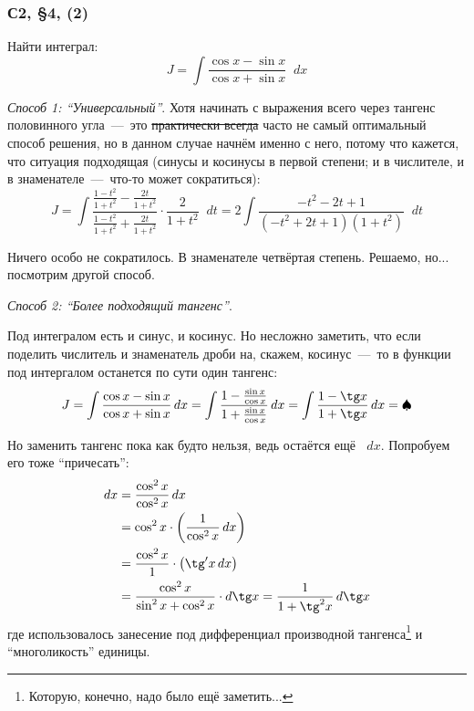 \documentclass[a4paper,12pt]{article}
\newcommand{\diff}{\mathop{}\!d}
\begin{document}
  \subsubsection{С2, \S 4, (2)}

  Найти интеграл:
  \begin{equation}\label{eq:int-15(2)}
    J = \int \frac{\cos x - \sin x}{\cos x + \sin x} \diff x
  \end{equation}
  
  \begin{solution}
    \emph{Способ 1: ``Универсальный''}.
    Хотя начинать с выражения всего через тангенс половинного угла~---~это \st{практически всегда} часто не самый оптимальный способ решения, но в данном случае начнём именно с него, потому что кажется, что ситуация подходящая (синусы и косинусы в первой степени; и в числителе, и в знаменателе~---~что-то может сократиться):
    \[
      J = \int \frac{\frac{1 - t^2}{1 + t^2} - \frac{2 t}{1 + t^2}}{\frac{1 - t^2}{1 + t^2} + \frac{2 t}{1 + t^2}} \cdot \frac{2}{1 + t^2} \diff t = 2\int \frac{-t^2 - 2t + 1}{(-t^2 + 2t + 1)(1 + t^2)} \diff t
    \]

    Ничего особо не сократилось.
    В знаменателе четвёртая степень.
    Решаемо, но... посмотрим другой способ.

    \medskip

    \noindent
    \emph{Способ 2: ``Более подходящий тангенс''}.

    Под интегралом есть и синус, и косинус.
    Но несложно заметить, что если поделить числитель и знаменатель дроби на, скажем, косинус~---~то в функции под интергалом останется по сути один тангенс:
    \[
      J = \int \frac{\cos x - \sin x}{\cos x + \sin x} \diff x
      = \int \frac{1 - \frac{\sin x}{\cos x}}{1 + \frac{\sin x}{\cos x}} \diff x
      = \int \frac{1 - \tg x}{1 + \tg x} \diff x = \spadesuit
    \]

    Но заменить тангенс пока как будто нельзя, ведь остаётся ещё $\diff x$.
    Попробуем его тоже ``причесать'':
    \begin{equation*}
    \begin{split}
      \diff x &= \frac{\cos^2 x}{\cos^2 x} \diff x\\
        &= \cos^2 x \cdot \left(\frac{1}{\cos^2 x} \diff x\right)\\
        &= \frac{\cos^2 x}{1} \cdot \left(\tg' x \diff x\right)\\
        &= \frac{\cos^2 x}{\sin^2 x + \cos^2 x} \cdot \diff \tg x
        = \frac{1}{1 + \tg^2 x} \diff \tg x
    \end{split}
    \end{equation*}
    где использовалось занесение под дифференциал производной тангенса\footnote{
      Которую, конечно, надо было ещё заметить...
    } и ``многоликость'' единицы.


\end{solution}
\end{document}
